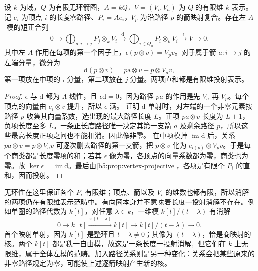 \begin{theorem}\label{b5:thm:acyclic-quiver-resolution}
	设 \(k\) 为域，\(Q\) 为有限无环箭图，\(A=kQ\)，\(V=(V_i,V_a)\) 为 \(Q\) 的有限维 \(k\) 表示。记 \(e_i\) 为顶点 \(i\) 的长度零路径、\(P_i=Ae_i\)，\(V_p\) 为沿路径 \(p\) 的箭映射复合。存在左 \(A\)-模的短正合列
	\[
		0\longrightarrow \bigoplus_{a:i\to j}P_j\otimes_k V_i \xrightarrow{\mathrm{d}} \bigoplus_{i\in Q_0}P_i\otimes_k V_i \xrightarrow{\epsilon}V\longrightarrow0.
	\]
	其中左 \(A\) 作用在每项的第一个因子上，\(\epsilon(p\otimes v)=V_pv\)。对于属于箭 \(a:i\to j\) 的左端分量，微分为
	\[
		\mathrm{d}(p\otimes v)=pa\otimes v-p\otimes V_av,
	\]
	第一项放在中项的 \(i\) 分量，第二项放在 \(j\) 分量。两项直和都是有限维投射表示。
\end{theorem}
\begin{proof}
	\(\epsilon\) 与 \(\mathrm{d}\) 都为 \(A\) 线性，且 \(\epsilon\mathrm{d}=0\)，因为路径 \(pa\) 的作用是先 \(V_a\) 再 \(V_p\)。每个顶点的向量由 \(e_i\otimes v\) 提升，所以 \(\epsilon\) 满。 证明 \(\mathrm{d}\) 单射时，对左端的一个非零元素按路径 \(p\) 收集其向量系数，选出现的最大路径长度 \(L\)。正项 \(pa\otimes v\) 长度为 \(L+1\)，负项长度至多 \(L\)。一条正长度路径唯一决定其第一支箭 \(a\) 及剩余路径 \(p\)，所以这些最高长度正项之间也不能相消。因此像非零。 在中项模掉 \(\operatorname{im}\mathrm{d}\) 后，关系 \(pa\otimes v=p\otimes V_av\) 可逐次删去路径的第一支箭，把 \(p\otimes v\) 化为 \(e_{t(p)}\otimes V_pv\)。于是每个商类都是长度零项的和；若其 \(\epsilon\) 像为零，各顶点的向量系数都为零，商类也为零。故 \(\ker\epsilon=\operatorname{im}\mathrm{d}\)。最后由\cref{b5:prop:vertex-projective}，各项是有限个 \(P_i\) 的直和，因而投射。
\end{proof}
无环性在这里保证各个 \(P_i\) 有限维；顶点、箭以及 \(V_i\) 的维数也都有限，所以消解的两项仍在有限维表示范畴中。有向圈本身并不意味着长度一投射消解不存在。例如单圈的路径代数为 \(k[t]\)，对任意 \(\lambda\in k\)，一维模 \(k[t]/(t-\lambda)\) 有消解
\[
	0\longrightarrow k[t]\xrightarrow{\times(t-\lambda)}k[t] \longrightarrow k[t]/(t-\lambda)\longrightarrow0.
\]
首个映射单射，因为 \(k[t]\) 是整环且 \(t-\lambda\ne0\)；其像为 \((t-\lambda)\)，恰是商映射的核。两个 \(k[t]\) 都是秩一自由模，故这是一条长度一投射消解，但它们在 \(k\) 上无限维，属于全体左模的范畴。加入路径关系则是另一种变化：关系会把某些原来的非零路径规定为零，可能使上述逐箭映射产生新的核。

\ProseParagraphBreak

